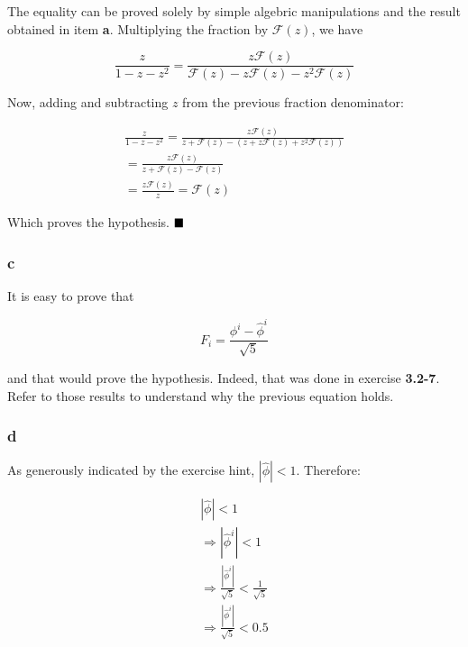 \documentclass[8pt,a4paper]{article}
\begin{document}
  The equality can be proved solely by simple algebric manipulations and the result obtained
in item \textbf{a}. Multiplying the fraction by $\mathcal{F}(z)$, we have

\begin{equation*}
  \frac{z}{1 - z - z^{2}} = \frac{z\mathcal{F}(z)}{\mathcal{F}(z) - z\mathcal{F}(z) - z^{2}\mathcal{F}(z)}
\end{equation*}

  Now, adding and subtracting $z$ from the previous fraction denominator:

\begin{equation*}
  \begin{split}
    \frac{z}{1 - z - z^{2}} = \frac{z\mathcal{F}(z)}{z + \mathcal{F}(z) - (z + z\mathcal{F}(z) + z^{2}\mathcal{F}(z))} \\
    = \frac{z\mathcal{F}(z)}{z + \mathcal{F}(z) - \mathcal{F}(z)} \\
    = \frac{z\mathcal{F}(z)}{z} = \mathcal{F}(z)
  \end{split}
\end{equation*}

  Which proves the hypothesis. $\qed$

\subsubsection*{c}

  It is easy to prove that

\begin{equation*}
  F_{i} = \frac{\phi^{i} - \widehat{\phi}^{i}}{\sqrt{5}}
\end{equation*}

  and that would prove the hypothesis. Indeed, that was done in exercise \textbf{3.2-7}.
Refer to those results to understand why the previous equation holds.

\subsubsection*{d}

As generously indicated by the exercise hint, $|\widehat{\phi}| < 1$. Therefore:

\begin{equation*}
  \begin{split}
    |\widehat{\phi}| < 1 \\
    \Rightarrow |\widehat{\phi}^{i}| < 1 \\
    \Rightarrow \frac{|\widehat{\phi}^{i}|}{\sqrt{5}} < \frac{1}{\sqrt{5}} \\
    \Rightarrow \frac{|\widehat{\phi}^{i}|}{\sqrt{5}} < 0.5
  \end{split}
\end{equation*}
\end{document}
